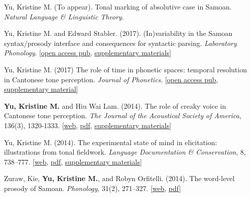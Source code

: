 \documentclass[10pt]{article}
\begin{document}
\begin{bibenum}

    \item Yu, Kristine M. (To appear). Tonal marking of absolutive case
      in Samoan. \emph{Natural Language \& Linguistic Theory}.
  
      \item Yu, Kristine M. and Edward Stabler. (2017).
        (In)variability in the Samoan syntax/prosody interface and consequences for
        syntactic parsing. \emph{Laboratory Phonology}. [\href{https://www.journal-labphon.org/articles/10.5334/labphon.113/}{open access pub}, \href{https://doi.org/10.5334/labphon.113.s1}{supplementary materials}]
    \item Yu, Kristine M. (2017) The role of time in phonetic
      spaces: temporal resolution in Cantonese tone
      perception. \emph{Journal of Phonetics}. [\href{https://doi.org/10.1016/j.wocn.2017.06.004}{open access pub}, \href{https://github.com/krismyu/resolution}{supplementary material}]
    \item \textbf{Yu, Kristine M.} and Hiu Wai Lam. (2014). The role of
      creaky voice in Cantonese tone perception. \emph{The Journal of
        the Acoustical Society of America}, 136(3), 1320-1333.
      [\href{http://scitation.aip.org/content/asa/journal/jasa/136/3/10.1121/1.4887462}{web},
      \href{http://www.krisyu.org/pages/pdfs/yulam2014-jasa-cantcr.pdf}{pdf},
      \href{http://www.krisyu.org/blog/supp-material-cantonese-creak-perception.html}{supplementary materials}]

    \item Yu, Kristine M. (2014). The experimental state of mind in
      elicitation: illustrations from tonal fieldwork. \emph{Language Documentation \&
        Conservation}, 8, 738--777. 
      [\href{http://scholarspace.manoa.hawaii.edu/bitstream/handle/10125/24623/Yu.pdf?sequence=1}{web},
      \href{http://www.krisyu.org/pages/pdfs/yu2014-kiy.pdf}{pdf}, 
      \href{http://www.krisyu.org/blog/ldc-kiy-overview.html}{supplementary materials}]

    \item Zuraw, Kie, \textbf{Yu, Kristine M.}, and Robyn Orfitelli. (2014). The word-level prosody of
      {S}amoan. \emph{Phonology}, 31(2), 271--327.
      [\href{http://dx.doi.org/10.1017/S095267571400013X}{web},
      \href{http://www.krisyu.org/pages/pdfs/zurawyuorfitelli2014.pdf}{pdf}]

\end{bibenum}
\end{document}

